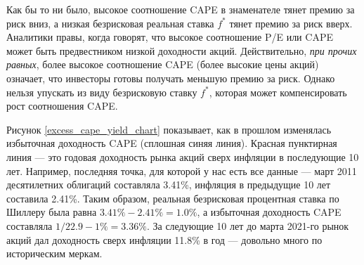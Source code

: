 Как бы то ни было, высокое соотношение CAPE в знаменателе тянет премию за риск 
вниз, а низкая безрисковая реальная ставка $f^*$ тянет премию за риск вверх. 
Аналитики правы, когда говорят, что высокое соотношение P/E или CAPE 
может быть предвестником низкой доходности акций. Действительно, \textit{при 
прочих равных}, более высокое соотношение CAPE (более высокие цены акций) 
означает, что инвесторы готовы получать меньшую премию за риск. Однако нельзя 
упускать из виду безрисковую ставку $f^*$, которая может компенсировать рост 
соотношения CAPE.

Рисунок \ref{excess_cape_yield_chart} показывает, как в прошлом изменялась 
избыточная доходность CAPE (сплошная синяя линия). Красная пунктирная линия 
--- это годовая доходность рынка акций сверх инфляции в последующие 10 лет. 
Например, последняя точка, для которой у нас есть все данные --- март 2011 
десятилетних облигаций составляла 3.41\%, инфляция в предыдущие 10 лет 
составила 2.41\%. 
Таким образом, реальная безрисковая процентная ставка по Шиллеру была равна 
$3.41\% - 2.41\% = 1.0\%$, а избыточная доходность CAPE составляла $1/22.9 - 
1\% = 3.36\%$. За следующие 10 лет до марта 2021-го рынок акций дал доходность 
сверх инфляции 11.8\% в год --- довольно много по историческим меркам.



